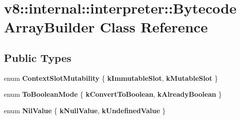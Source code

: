 \hypertarget{classv8_1_1internal_1_1interpreter_1_1BytecodeArrayBuilder}{}\section{v8\+:\+:internal\+:\+:interpreter\+:\+:Bytecode\+Array\+Builder Class Reference}
\label{classv8_1_1internal_1_1interpreter_1_1BytecodeArrayBuilder}
\subsection*{Public Types}
\begin{DoxyCompactItemize}
\item 
\mbox{\label{classv8_1_1internal_1_1interpreter_1_1BytecodeArrayBuilder_a0f9c12bd02663f9803cd77fb99398d92}} 
enum {\bfseries Context\+Slot\+Mutability} \{ {\bfseries k\+Immutable\+Slot}, 
{\bfseries k\+Mutable\+Slot}
 \}
\item 
\mbox{\label{classv8_1_1internal_1_1interpreter_1_1BytecodeArrayBuilder_ac86a9dd664b8c36f9f024d8756928e14}} 
enum {\bfseries To\+Boolean\+Mode} \{ {\bfseries k\+Convert\+To\+Boolean}, 
{\bfseries k\+Already\+Boolean}
 \}
\item 
\mbox{\label{classv8_1_1internal_1_1interpreter_1_1BytecodeArrayBuilder_a4a39904e97a4c8575720cee8d091e86f}} 
enum {\bfseries Nil\+Value} \{ {\bfseries k\+Null\+Value}, 
{\bfseries k\+Undefined\+Value}
 \}
\end{DoxyCompactItemize}
